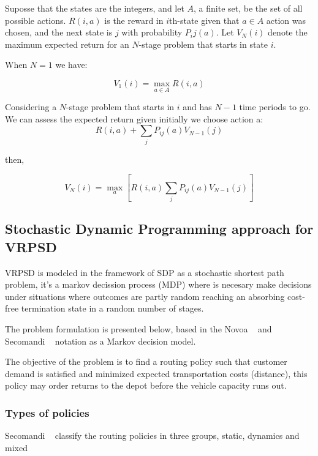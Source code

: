 Suposse that the states are the integers, and let $A$, a finite set, be the set of all possible actions.
$R(i,a)$ is the reward in $i$th-state given that $a \in A$ action was chosen, and the next state is $j$ with probability $P_ij(a)$.
Let $V_N(i)$ denote the maximum expected return for an $N$-stage problem that starts in state $i$.

When $N=1$ we have:

\begin{equation}\label{eq:maxValueN=1}
 V_1(i) =  \max_{a\in A}R(i,a)
\end{equation}

Considering a $N$-stage problem that starts in $i$ and has $N-1$ time periods to go. We can assess the expected return given initially we choose action a:
\[R(i,a)+\sum_jP_{ij}(a)V_{N-1}(j)\]

then,

\begin{equation}
 V_N(i)=\max_a[R(i,a)\sum_jP_{ij}(a)V_{N-1}(j)]
\end{equation}


\subsection{Stochastic Dynamic Programming approach for VRPSD}\label{sec:SDP_model_VRPSD}

VRPSD is modeled in the framework of SDP as a stochastic shortest path problem, it's a markov decission process (MDP) where is necesary make decisions under situations where outcomes are partly random reaching an absorbing cost-free termination state in a random number of stages.

The problem formulation is presented below, based in the Novoa ~\cite{novoa_approximate_2009} and Secomandi ~\cite{secomandi_rollout_2001} notation as a Markov decision model.

The objective of the problem is to find a routing policy such that customer demand is satisfied and minimized expected transportation costs (distance), this policy may order returns to the depot before the vehicle capacity runs out.

\subsubsection{Types of policies}

Secomandi ~\cite{secomandi_comparing_2000} classify the routing policies in three groups, static, dynamics and mixed

